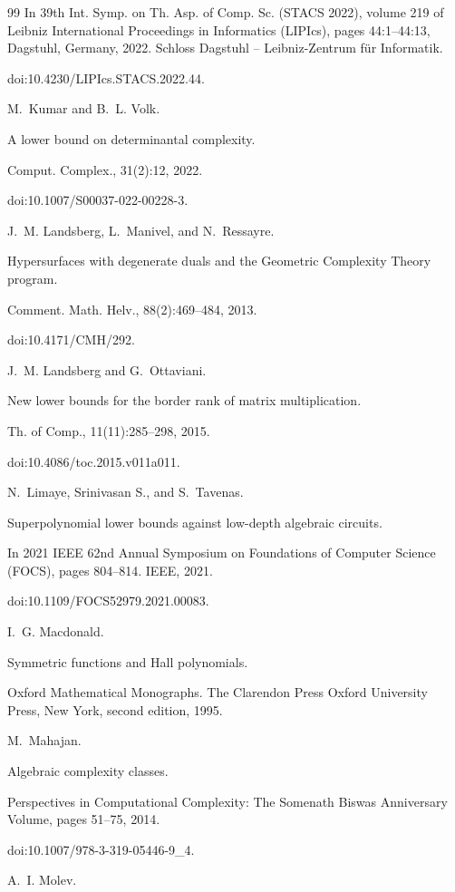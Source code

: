 \begin{thebibliography}{99}
In 39th Int. Symp. on Th. Asp. of Comp. Sc. (STACS 2022),
volume 219 of Leibniz International Proceedings in Informatics
(LIPIcs), pages 44:1–44:13, Dagstuhl, Germany, 2022. Schloss Dagstuhl –
Leibniz-Zentrum für Informatik.


doi:10.4230/LIPIcs.STACS.2022.44.

M. Kumar and B. L. Volk.


A lower bound on determinantal complexity.


Comput. Complex., 31(2):12, 2022.


doi:10.1007/S00037-022-00228-3.

J. M. Landsberg, L. Manivel, and N. Ressayre.


Hypersurfaces with degenerate duals and the Geometric Complexity
Theory program.


Comment. Math. Helv., 88(2):469–484, 2013.


doi:10.4171/CMH/292.

J. M. Landsberg and G. Ottaviani.


New lower bounds for the border rank of matrix multiplication.


Th. of Comp., 11(11):285–298, 2015.


doi:10.4086/toc.2015.v011a011.

N. Limaye, Srinivasan S., and S. Tavenas.


Superpolynomial lower bounds against low-depth algebraic circuits.


In 2021 IEEE 62nd Annual Symposium on Foundations of Computer
Science (FOCS), pages 804–814. IEEE, 2021.


doi:10.1109/FOCS52979.2021.00083.

I. G. Macdonald.


Symmetric functions and Hall polynomials.


Oxford Mathematical Monographs. The Clarendon Press Oxford
University Press, New York, second edition, 1995.

M. Mahajan.


Algebraic complexity classes.


Perspectives in Computational Complexity: The Somenath Biswas
Anniversary Volume, pages 51–75, 2014.


doi:10.1007/978-3-319-05446-9\_4.

A. I. Molev.



\end{thebibliography}
